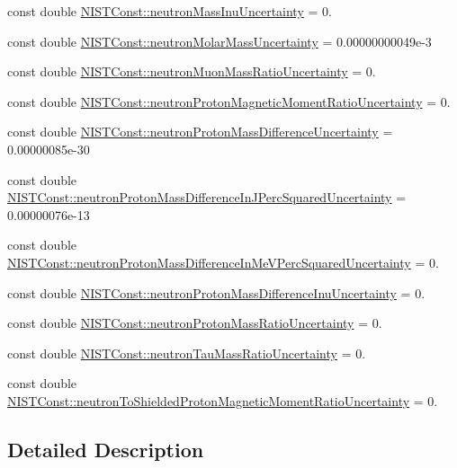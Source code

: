 \begin{DoxyCompactItemize}
\item 
const double \hyperlink{group___neutron_ga660ae4587a0399c1f58f3ba6142c4b9e}{N\+I\+S\+T\+Const\+::neutron\+Mass\+Inu\+Uncertainty} = 0.
\item 
const double \hyperlink{group___neutron_ga1b4a0903f80697bbb3343767351da3ab}{N\+I\+S\+T\+Const\+::neutron\+Molar\+Mass\+Uncertainty} = 0.\+00000000049e-\/3
\item 
const double \hyperlink{group___neutron_ga54f9049bce28d81a3ad2420dc2bb407d}{N\+I\+S\+T\+Const\+::neutron\+Muon\+Mass\+Ratio\+Uncertainty} = 0.
\item 
const double \hyperlink{group___neutron_ga4a027a1c846b998039d3448b72421caf}{N\+I\+S\+T\+Const\+::neutron\+Proton\+Magnetic\+Moment\+Ratio\+Uncertainty} = 0.
\item 
const double \hyperlink{group___neutron_gaa120a63bbe7a62d24c2e7ccab3e889d1}{N\+I\+S\+T\+Const\+::neutron\+Proton\+Mass\+Difference\+Uncertainty} = 0.\+00000085e-\/30
\item 
const double \hyperlink{group___neutron_gaee1fb077bb946b8bd7df60ac2bc6e7e7}{N\+I\+S\+T\+Const\+::neutron\+Proton\+Mass\+Difference\+In\+J\+Perc\+Squared\+Uncertainty} = 0.\+00000076e-\/13
\item 
const double \hyperlink{group___neutron_ga57857edd0ec92aa1ed06edc688aecad9}{N\+I\+S\+T\+Const\+::neutron\+Proton\+Mass\+Difference\+In\+Me\+V\+Perc\+Squared\+Uncertainty} = 0.
\item 
const double \hyperlink{group___neutron_gad3c6909951abc224df3af9739f3ed08e}{N\+I\+S\+T\+Const\+::neutron\+Proton\+Mass\+Difference\+Inu\+Uncertainty} = 0.
\item 
const double \hyperlink{group___neutron_ga74cca90bc106fb1c82ebb51ceb2036f2}{N\+I\+S\+T\+Const\+::neutron\+Proton\+Mass\+Ratio\+Uncertainty} = 0.
\item 
const double \hyperlink{group___neutron_gac328a3ee0b34cc5009c70ffc28d666fb}{N\+I\+S\+T\+Const\+::neutron\+Tau\+Mass\+Ratio\+Uncertainty} = 0.
\item 
const double \hyperlink{group___neutron_gaff82970ee04703c04a57ec28950bbd18}{N\+I\+S\+T\+Const\+::neutron\+To\+Shielded\+Proton\+Magnetic\+Moment\+Ratio\+Uncertainty} = 0.
\end{DoxyCompactItemize}


\subsection{Detailed Description}


